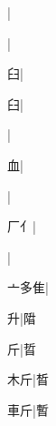 \begin{multicols}{2}
{{}\mktsJzrVerticalBar{}{\cjk{}{\cnsym{}　}{\cnsym{}　}{\cnsym{}　}}|{}\par
{}\mktsJzrVerticalBar{}{\cjk{}{\cnsym{}　}{\cnsym{}　}{\cnsym{}　}}|{}\par
{\cjk{}{\cnsym{}　}{\cnsym{}　}臼}\mktsJzrVerticalBar{}{\cjk{}{\cnsym{}　}{\cnsym{}　}{\cnsym{}　}}|{}\par
{臼}\mktsJzrVerticalBar{}{\cjk{}{\cnsym{}　}{\cnsym{}　}{\cnsym{}　}}|{}\par
{}\mktsJzrVerticalBar{}{\cjk{}{\cnsym{}　}{\cnsym{}　}{\cnsym{}　}}|{}\par
{\cjk{}{\cnsym{}　}{\cnsym{}　}血}\mktsJzrVerticalBar{}{\cjk{}{\cnsym{}　}{\cnsym{}　}{\cnsym{}　}}|{}\par
{}\mktsJzrVerticalBar{}{\cjk{}{\cnsym{}　}{\cnsym{}　}{\cnsym{}　}}|{}\par
{\cjk{}{\cnsym{}　}厂{亻}}\mktsJzrVerticalBar{}{\cjk{}{\cnsym{}　}{\cnsym{}　}{\cnsym{}　}}|{}\par
{}\mktsJzrVerticalBar{}{\cjk{}{\cnsym{}　}{\cnsym{}　}{\cnsym{}　}}|{}\par
{\cjk{}亠多隹}\mktsJzrVerticalBar{}{\cjk{}{\cnsym{}　}{\cnsym{}　}{\cnsym{}　}}|{}\par
{升}\mktsJzrVerticalBar{}{\cjk{}{\cnsym{}　}{\cnsym{}　}{\cnsym{}　}}|{\cjk{}陹}\par
{斤}\mktsJzrVerticalBar{}{\cjk{}{\cnsym{}　}{\cnsym{}　}{\cnsym{}　}}|{\cjk{}晢}\par
{\cjk{}{\cnsym{}　}木斤}\mktsJzrVerticalBar{}{\cjk{}{\cnsym{}　}{\cnsym{}　}{\cnsym{}　}}|{\cjk{}晳}\par
{\cjk{}{\cnsym{}　}車斤}\mktsJzrVerticalBar{}{\cjk{}{\cnsym{}　}{\cnsym{}　}{\cnsym{}　}}|{\cjk{}暫}\par
}
\end{multicols}

